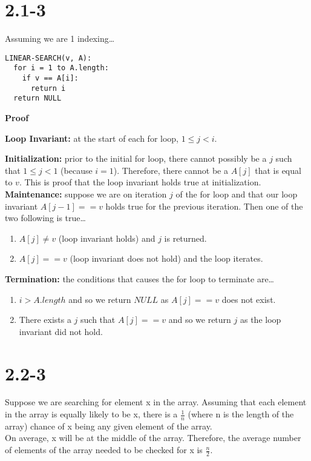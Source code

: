 \documentclass{article}
\begin{document}
\section{2.1-3}
Assuming we are 1 indexing\ldots
\begin{verbatim}
LINEAR-SEARCH(v, A):
  for i = 1 to A.length:
    if v == A[i]:
      return i
  return NULL
\end{verbatim}

\noindent
{\bfseries{\large Proof}}

\noindent
\textbf{Loop Invariant:} at the start of each for loop, $1 \leq j < i$. \\
{\textbf{Initialization:} prior to the initial for loop, there
  cannot possibly be a $j$ such that $1 \leq j < 1$ (because $i = 1$).
  Therefore, there cannot be a $A[j]$ that is equal to $v$. This
  is proof that the loop invariant holds true at initialization. \\
\textbf{Maintenance:} suppose we are on iteration $j$ of the for
  loop and that our loop invariant $A[j-1] == v$ holds true
  for the previous iteration. Then one of the two following
  is true\ldots
  \begin{enumerate}
    \item $A[j] \neq v$ (loop invariant holds) and $j$ is returned.
    \item $A[j] == v$ (loop invariant does not hold) and the loop iterates.
  \end{enumerate}
\textbf{Termination:} the conditions that causes the for loop to terminate
  are\ldots
\begin{enumerate}
  \item $i > A.length$ and so we return $NULL$ as $A[j] == v$ does
    not exist.
  \item There exists a $j$ such that $A[j] == v$ and so we return $j$
    as the loop invariant did not hold.
\end{enumerate}

\section{2.2-3}
Suppose we are searching for element x in the array.
  Assuming that each element in the array is equally likely to be x,
  there is a $\frac{1}{n}$ (where n is the length of the array) chance
  of x being any given element of the array. \\

\noindent
On average, x will be at the middle of the array.
  Therefore, the average number of elements of the array needed to be
  checked for x is $\frac{n}{2}$. \\

}
\end{document}
